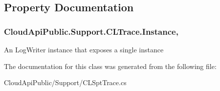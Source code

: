 \subsection{Property Documentation}
\hypertarget{class_cloud_api_public_1_1_support_1_1_c_l_trace_a0861d3bda40d01c666acb82cef1cb595}{
\subsubsection[{Instance}]{ Cloud\-Api\-Public.\-Support.\-C\-L\-Trace.\-Instance\hspace{0.3cm}{\ttfamily [static]}, {\ttfamily [get]}}}\label{class_cloud_api_public_1_1_support_1_1_c_l_trace_a0861d3bda40d01c666acb82cef1cb595}


An Log\-Writer instance that exposes a single instance 



The documentation for this class was generated from the following file\-:\begin{DoxyCompactItemize}
\item 
Cloud\-Api\-Public/\-Support/C\-L\-Spt\-Trace.\-cs\end{DoxyCompactItemize}

